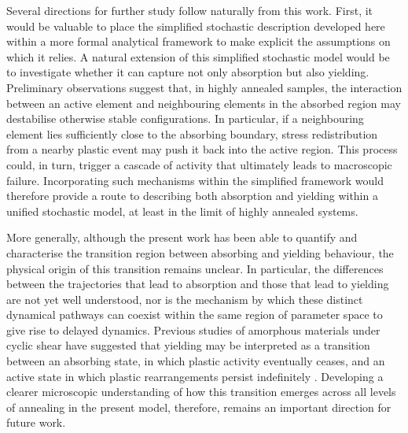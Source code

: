 Several directions for further study follow naturally from this work. First, it would be valuable to place the simplified stochastic description developed here within a more formal analytical framework to make explicit the assumptions on which it relies.
A natural extension of this simplified stochastic model would be to investigate whether it can capture not only absorption but also yielding. Preliminary observations suggest that, in highly annealed samples, the interaction between an active element and neighbouring elements in the absorbed region may destabilise otherwise stable configurations. In particular, if a neighbouring element lies sufficiently close to the absorbing boundary, stress redistribution from a nearby plastic event may push it back into the active region. This process could, in turn, trigger a cascade of activity that ultimately leads to macroscopic failure. Incorporating such mechanisms within the simplified framework would therefore provide a route to describing both absorption and yielding within a unified stochastic model, at least in the limit of highly annealed systems.

More generally, although the present work has been able to quantify and characterise the transition region between absorbing and yielding behaviour, the physical origin of this transition remains unclear. In particular, the differences between the trajectories that lead to absorption and those that lead to yielding are not yet well understood, nor is the mechanism by which these distinct dynamical pathways can coexist within the same region of parameter space to give rise to delayed dynamics. Previous studies of amorphous materials under cyclic shear have suggested that yielding may be interpreted as a transition between an absorbing state, in which plastic activity eventually ceases, and an active state in which plastic rearrangements persist indefinitely \cite{JocteurYielding2024}. Developing a clearer microscopic understanding of how this transition emerges across all levels of annealing in the present model, therefore, remains an important direction for future work.

